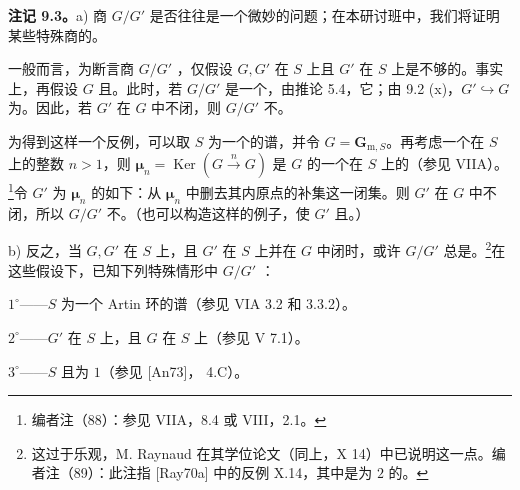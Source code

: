 \textbf{注记 9.3。}a) 商 $G/G'$ 是否往往是一个微妙的问题；在本研讨班中，我们将证明某些特殊商的。

一般而言，为断言商 $G/G'$ ，仅假设 $G,G'$ 在 $S$ 上且 $G'$ 在 $S$ 上是不够的。事实上，再假设 $G$ 且。此时，若 $G/G'$ 是一个，由推论 5.4，它；由 9.2 (x)，$G'\hookrightarrow G$ 为。因此，若 $G'$ 在 $G$ 中不闭，则 $G/G'$ 不。

为得到这样一个反例，可以取 $S$ 为一个的谱，并令 $G=\mathbf G_{\mathrm m,S}$。再考虑一个在 $S$ 上的整数 $n>1$，则 $\boldsymbol\mu_n=\operatorname{Ker}(G\xrightarrow{n}G)$ 是 $G$ 的一个在 $S$ 上的（参见 VIIA）。\footnote{编者注（88）：参见 VIIA，8.4 或 VIII，2.1。}令 $G'$ 为 $\boldsymbol\mu_n$ 的如下：从 $\boldsymbol\mu_n$ 中删去其内原点的补集这一闭集。则 $G'$ 在 $G$ 中不闭，所以 $G/G'$ 不。（也可以构造这样的例子，使 $G'$ 且。）

b) 反之，当 $G,G'$ 在 $S$ 上，且 $G'$ 在 $S$ 上并在 $G$ 中闭时，或许 $G/G'$ 总是。\footnote{这过于乐观，M. Raynaud 在其学位论文（同上，X 14）中已说明这一点。编者注（89）：此注指 [Ray70a] 中的反例 X.14，其中是为 $2$ 的。}在这些假设下，已知下列特殊情形中 $G/G'$ ：

$1^\circ$——$S$ 为一个 Artin 环的谱（参见 VIA 3.2 和 3.3.2）。

$2^\circ$——$G'$ 在 $S$ 上，且 $G$ 在 $S$ 上（参见 V 7.1）。

$3^\circ$——$S$ 且为 $1$（参见 [An73]， 4.C）。
